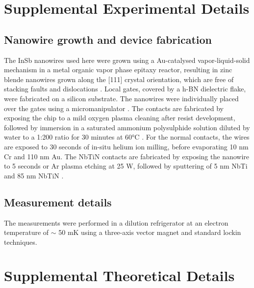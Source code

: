 \documentclass[prl,singlecolumn,notitlepage,secnumroman,superscriptaddress,nobibnotes,graphicx,amsmath,amssymb]{revtex4-2}
\begin{document}
\pacs{}%

\maketitle %
\tableofcontents

\newpage
\section{Supplemental Experimental Details}
\subsection{Nanowire growth and device fabrication}
The \mbox{InSb} nanowires used here were grown using a Au-catalysed vapor-liquid-solid mechanism in a metal organic vapor phase epitaxy reactor, resulting in zinc blende nanowires grown \mbox{along} the [111] crystal orientation, which are free of stacking \mbox{faults} and dislocations \cite{Car2014}. Local gates, covered by a h-BN dielectric flake, were fabricated on a silicon substrate. The nanowires were individually placed over the gates using a micromanipulator \cite{Flohr2011}. The contacts are fabricated by exposing the chip to a mild oxygen plasma cleaning after resist development, followed by immersion in a saturated ammonium polysulphide solution diluted by water to a 1:200 ratio for 30 minutes at \ang{60}C \cite{Suyatin2007}. For the normal contacts, the wires are exposed to 30 seconds of in-situ helium ion milling, before evaporating 10 nm Cr and 110 nm Au. The NbTiN contacts are fabricated by exposing the nanowire to 5 seconds or Ar plasma etching at 25 W, followed by sputtering of 5 nm NbTi and 85 nm NbTiN \cite{HardGap,BalSc}.

\subsection{Measurement details}
The measurements were performed in a dilution refrigerator at an electron temperature of $\sim$ 50 mK  using a three-axis vector magnet and standard lockin techniques.

\newpage
\section{Supplemental Theoretical Details}
\end{document}
